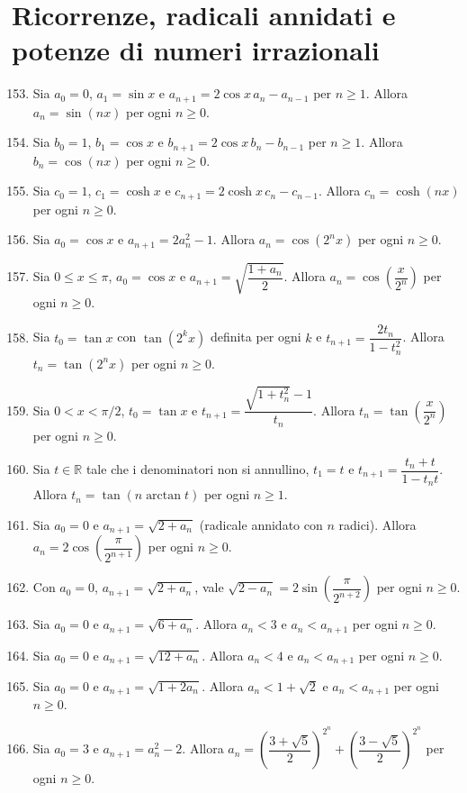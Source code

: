 \documentclass[11pt,a4paper]{article}
\begin{document}
\section*{Ricorrenze, radicali annidati e potenze di numeri irrazionali}
\begin{enumerate}
\setcounter{enumi}{152}
\item Sia $a_0=0$, $a_1=\sin x$ e $a_{n+1}=2\cos x\,a_n-a_{n-1}$ per $n\ge1$. Allora $a_n=\sin(nx)$ per ogni $n\ge0$.
\item Sia $b_0=1$, $b_1=\cos x$ e $b_{n+1}=2\cos x\,b_n-b_{n-1}$ per $n\ge1$. Allora $b_n=\cos(nx)$ per ogni $n\ge0$.
\item Sia $c_0=1$, $c_1=\cosh x$ e $c_{n+1}=2\cosh x\,c_n-c_{n-1}$. Allora $c_n=\cosh(nx)$ per ogni $n\ge0$.
\item Sia $a_0=\cos x$ e $a_{n+1}=2a_n^2-1$. Allora $a_n=\cos\left(2^n x\right)$ per ogni $n\ge0$.
\item Sia $0\le x\le\pi$, $a_0=\cos x$ e $a_{n+1}=\sqrt{\dfrac{1+a_n}{2}}$. Allora $a_n=\cos\left(\dfrac{x}{2^n}\right)$ per ogni $n\ge0$.
\item Sia $t_0=\tan x$ con $\tan\left(2^k x\right)$ definita per ogni $k$ e $t_{n+1}=\dfrac{2t_n}{1-t_n^2}$. Allora $t_n=\tan\left(2^n x\right)$ per ogni $n\ge0$.
\item Sia $0<x<\pi/2$, $t_0=\tan x$ e $t_{n+1}=\dfrac{\sqrt{1+t_n^2}-1}{t_n}$. Allora $t_n=\tan\left(\dfrac{x}{2^n}\right)$ per ogni $n\ge0$.
\item Sia $t\in\mathbb{R}$ tale che i denominatori non si annullino, $t_1=t$ e $t_{n+1}=\dfrac{t_n+t}{1-t_n t}$. Allora $t_n=\tan(n\arctan t)$ per ogni $n\ge1$.
\item Sia $a_0=0$ e $a_{n+1}=\sqrt{2+a_n}$ (radicale annidato con $n$ radici). Allora $a_n=2\cos\left(\dfrac{\pi}{2^{n+1}}\right)$ per ogni $n\ge0$.
\item Con $a_0=0$, $a_{n+1}=\sqrt{2+a_n}$, vale $\sqrt{2-a_n}=2\sin\left(\dfrac{\pi}{2^{n+2}}\right)$ per ogni $n\ge0$.
\item Sia $a_0=0$ e $a_{n+1}=\sqrt{6+a_n}$. Allora $a_n<3$ e $a_n<a_{n+1}$ per ogni $n\ge0$.
\item Sia $a_0=0$ e $a_{n+1}=\sqrt{12+a_n}$. Allora $a_n<4$ e $a_n<a_{n+1}$ per ogni $n\ge0$.
\item Sia $a_0=0$ e $a_{n+1}=\sqrt{1+2a_n}$. Allora $a_n<1+\sqrt2$ e $a_n<a_{n+1}$ per ogni $n\ge0$.
\item Sia $a_0=3$ e $a_{n+1}=a_n^2-2$. Allora $a_n=\left(\dfrac{3+\sqrt5}{2}\right)^{2^n}+\left(\dfrac{3-\sqrt5}{2}\right)^{2^n}$ per ogni $n\ge0$.

\end{enumerate}
\end{document}
